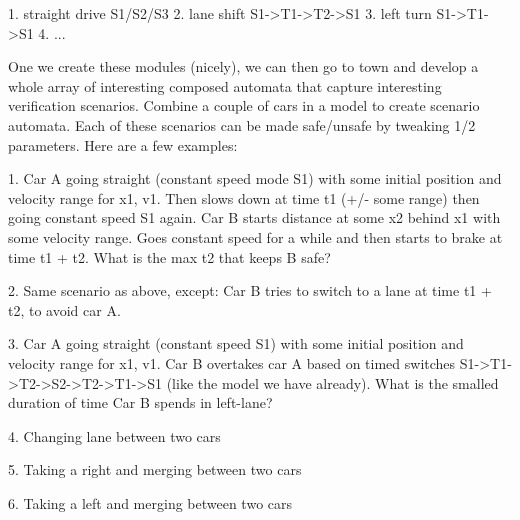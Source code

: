 1. straight drive S1/S2/S3
2. lane shift S1->T1->T2->S1
3. left turn S1->T1->S1
4. ...

One we create these modules (nicely), we can then go to town and develop a whole array of interesting composed automata that capture interesting verification scenarios. Combine a couple of cars in a model to create scenario automata. Each of these scenarios can be made safe/unsafe by tweaking 1/2 parameters. Here are a few examples:

1. Car A going straight (constant speed mode S1) with some initial position and velocity range for x1, v1. Then slows down at time t1 (+/- some range) then going constant speed S1 again. Car B starts distance at some x2 behind x1 with some velocity range. Goes constant speed for a while and then starts to brake at time t1 + t2. What is the max t2 that keeps B safe?

2. Same scenario as above, except: Car B tries to switch to a lane at time t1 + t2, to avoid car A.

3. Car A going straight (constant speed S1) with some initial position and velocity range for x1, v1. Car B overtakes car A based on timed switches S1->T1->T2->S2->T2->T1->S1 (like the model we have already). What is the smalled duration of time Car B spends in left-lane?

4. Changing lane between two cars 

5. Taking a right and merging between two cars

6. Taking a left and merging between two cars